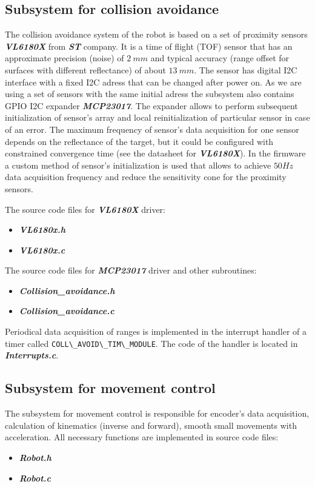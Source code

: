 \documentclass[a4paper,12pt]{article} %
\newcommand{\textitbf}[1]{\textbf{\textit{#1}}}
\newcommand{\inlinecode}[1]{\lstinline{#1}}
\begin{document}
\subsection{Subsystem for collision avoidance}
The collision avoidance system of the robot is based on a set of proximity sensors \textitbf{VL6180X} from \textitbf{ST} company. It is a time of flight (TOF) sensor that has an approximate precision (noise) of $2\:mm$ and typical accuracy (range offset for surfaces with different reflectance) of about $13\:mm$. The sensor has digital I2C interface with a fixed I2C adress that can be changed after power on. As we are using a set of sensors with the same initial adress the subsystem also contains GPIO I2C expander \textitbf{MCP23017}. The expander allows to perform subsequent initialization of sensor's array and local reinitialization of particular sensor in case of an error. The maximum frequency of sensor's data acquisition for one sensor depends on the reflectance of the target, but it could be configured with constrained convergence time (see the datasheet for \textitbf{VL6180X}). In the firmware a custom method of sensor's initialization is used that allows to achieve $50 Hz$ data acquisition frequency and reduce the sensitivity cone for the proximity sensors. 

The source code files for  \textitbf{VL6180X} driver:
\begin{itemize}
	\item \textitbf{VL6180x.h}
	\item \textitbf{VL6180x.c}
\end{itemize}

The source code files for  \textitbf{MCP23017} driver and other subroutines:
\begin{itemize}
	\item \textitbf{Collision\_avoidance.h}
	\item \textitbf{Collision\_avoidance.c}
\end{itemize}

Periodical data acquisition of ranges is implemented in the interrupt handler of a timer called \inlinecode{COLL\_AVOID\_TIM\_MODULE}. The code of the handler is located in \textitbf{Interrupts.c}.

\subsection{Subsystem for movement control}
The subsystem for movement control is responsible for encoder's data acquisition, calculation of kinematics (inverse and forward), smooth small movements with acceleration. All necessary functions are implemented in source code files:
\begin{itemize}
	\item \textitbf{Robot.h}
	\item \textitbf{Robot.c}
\end{itemize}
\end{document}
